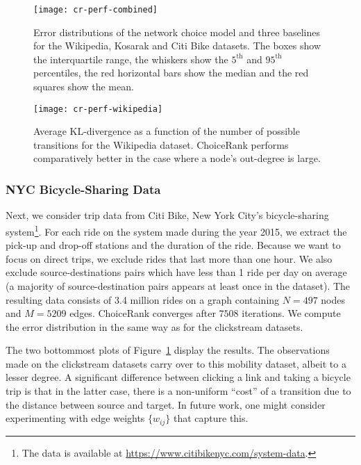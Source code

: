 \begin{figure}
  \centering
  \texttt{[image: cr-perf-combined]}
  \caption{
Error distributions of the network choice model and three baselines for the Wikipedia, Kosarak and Citi Bike datasets.
The boxes show the interquartile range, the whiskers show the $5^{\text{th}}$ and $95^{\text{th}}$ percentiles, the red horizontal bars show the median and the red squares show the mean.
}
  \label{cr:fig:perf-combined}
\end{figure}

\begin{figure}
  \centering
  \texttt{[image: cr-perf-wikipedia]}
  \caption{
Average KL-divergence as a function of the number of possible transitions for the Wikipedia dataset.
ChoiceRank performs comparatively better in the case where a node's out-degree is large.
}
  \label{cr:fig:perf-wikipedia}
\end{figure}


\subsubsection{NYC Bicycle-Sharing Data}

Next, we consider trip data from Citi Bike, New York City's bicycle-sharing system\footnote{The data is available at \url{https://www.citibikenyc.com/system-data}.}.
For each ride on the system made during the year 2015, we extract the pick-up and drop-off stations and the duration of the ride.
Because we want to focus on direct trips, we exclude rides that last more than one hour.
We also exclude source-destinations pairs which have less than 1 ride per day on average (a majority of source-destination pairs appears at least once in the dataset).
The resulting data consists of \num{3.4} million rides on a graph containing $N = \num{497}$ nodes and $M = \num{5209}$ edges.
ChoiceRank converges after $\num{7508}$ iterations.
We compute the error distribution in the same way as for the clickstream datasets.

The two bottommost plots of Figure~\ref{cr:fig:perf-combined} display the results.
The observations made on the clickstream datasets carry over to this mobility dataset, albeit to a lesser degree.
A significant difference between clicking a link and taking a bicycle trip is that in the latter case, there is a non-uniform ``cost'' of a transition due to the distance between source and target.
In future work, one might consider experimenting with edge weights $\{ w_{ij} \}$ that capture this.


